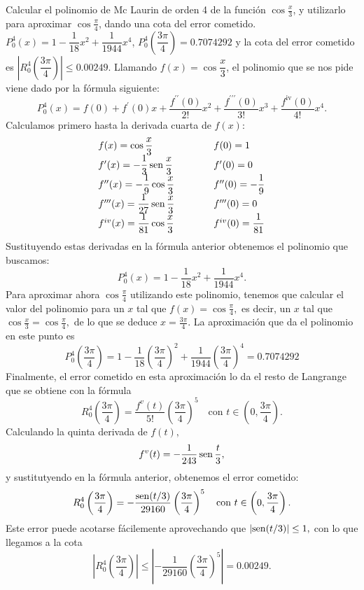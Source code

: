 {Calcular el polinomio de Mc Laurin de orden 4 de la función $\cos\frac{x}{3}$, y utilizarlo para aproximar $\cos\frac{\pi}{4}$, dando una
cota del error cometido.
}
{$P_0^4(x)=1-\dfrac{1}{18}x^2+\dfrac{1}{1944}x^4$, $P_0^4\left(\dfrac{3\pi }{4}\right) = 0.7074292$ y la cota del error cometido es $\left|R_0^4\left(\dfrac{3\pi}{4}\right)\right| \leq 0.00249.$
}
{Llamando $f(x)=\cos\dfrac{x}{3}$, el polinomio que se nos pide viene dado por la fórmula siguiente: 
\[
P_0^4(x)=f(0)+f^{\prime }(0)x+\frac{f^{\prime \prime }(0)}{2!}x^2+\frac{f^{\prime \prime \prime }(0)}{3!}x^3+\frac{f^{\text{iv}}(0)}{4!}x^4.
\]
Calculamos primero hasta la derivada cuarta de $f(x)$:
\[
\begin{array}{lll}
f(x)=\cos\dfrac{x}{3} & \qquad & f(0)=1 \\
f^{\prime }(x)=-\dfrac{1}{3}\operatorname{sen}\dfrac{x}{3} & &  f^{\prime }(0)=0 \\
f^{\prime \prime }(x)=-\dfrac{1}{9}\cos\dfrac{x}{3} &  & f^{\prime \prime }(0)=-\dfrac{1}{9}\\
f^{\prime \prime \prime}(x)=\dfrac{1}{27}\operatorname{sen}\dfrac{x}{3} & &  f^{\prime \prime \prime }(0)=0 \\
f^{iv}(x)=\dfrac{1}{81}\cos\dfrac{x}{3} & & f^{iv}(0)=\dfrac{1}{81}
\end{array}
\]
Sustituyendo estas derivadas en la fórmula anterior obtenemos el polinomio que buscamos: 
\[
P_0^4(x)=1-\dfrac{1}{18}x^2+\frac{1}{1944}x^4.
\]
Para aproximar ahora $\cos\frac{\pi}{4}$ utilizando este polinomio, tenemos que calcular el valor del polinomio para un $x$ tal que $f(x)=\cos\frac{\pi}{4},$ es decir, un $x$ tal que $\cos\frac{x}{3}=\cos\frac{\pi}{4},$ de lo que se deduce $x=\frac{3\pi}{4}$. La aproximación que da el polinomio en este punto es 
\[
P_0^4\left(\dfrac{3\pi }{4}\right)=1-\dfrac{1}{18}\left(\dfrac{3\pi}{4}\right)^2+\frac{1}{1944}\left(\dfrac{3\pi}{4}\right)^4=0.7074292
\]
Finalmente, el error cometido en esta aproximación lo da el resto de Langrange que se obtiene con la fórmula 
\[
R_0^4\left(\dfrac{3\pi}{4}\right)=\frac{f^{v}(t)}{5!}\left(\dfrac{3\pi}{4}\right)^5\quad \text{con }t\in \left(0,\frac{3\pi}{4}\right).
\]
Calculando la quinta derivada de $f(t),$
\[
f^{v}(t)=-\dfrac{1}{243}\operatorname{sen}\dfrac{t}{3},
\]
y sustitutyendo en la fórmula anterior, obtenemos el error cometido: 
\[
R_0^4\left(\dfrac{3\pi}{4}\right)=-\dfrac{\operatorname{sen}(t/3)}{29160}\left(\dfrac{3\pi}{4}\right)^5\quad \text{con }t\in \left(0,\frac{3\pi}{4}\right).
\]
Este error puede acotarse fácilemente aprovechando que $\left|\operatorname{sen}(t/3)\right| \leq 1,$ con lo que llegamos a la cota 
\[
\left|R_0^4\left(\dfrac{3\pi}{4}\right)\right| \leq \left|-\dfrac{1}{29160}\left(\dfrac{3\pi}{4}\right)^5\right| = 0.00249.
\]
}


